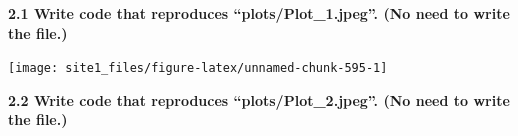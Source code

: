 \documentclass[]{book}
\newenvironment{Shaded}{\begin{snugshade}}{\end{snugshade}}
\newcommand{\CommentTok}[1]{\textcolor[rgb]{0.56,0.35,0.01}{\textit{#1}}}
\newcommand{\DataTypeTok}[1]{\textcolor[rgb]{0.13,0.29,0.53}{#1}}
\newcommand{\DecValTok}[1]{\textcolor[rgb]{0.00,0.00,0.81}{#1}}
\newcommand{\FloatTok}[1]{\textcolor[rgb]{0.00,0.00,0.81}{#1}}
\newcommand{\KeywordTok}[1]{\textcolor[rgb]{0.13,0.29,0.53}{\textbf{#1}}}
\newcommand{\NormalTok}[1]{#1}
\newcommand{\OperatorTok}[1]{\textcolor[rgb]{0.81,0.36,0.00}{\textbf{#1}}}
\newcommand{\StringTok}[1]{\textcolor[rgb]{0.31,0.60,0.02}{#1}}
\begin{document}
\textbf{2.1 Write code that reproduces ``plots/Plot\_1.jpeg''. (No need to write the file.)}

\begin{Shaded}
\end{Shaded}

\begin{center}\texttt{[image: site1\_files/figure-latex/unnamed-chunk-595-1]} \end{center}

\textbf{2.2 Write code that reproduces ``plots/Plot\_2.jpeg''. (No need to write the file.)}
\end{document}
